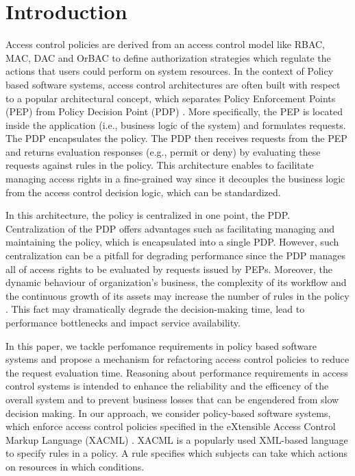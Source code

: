 
\section{Introduction} \label{sec:introduction}

Access control policies are derived from an access control model like RBAC, MAC, DAC and OrBAC \cite{dac,mac,rbac,orbac} to define authorization strategies which regulate the
 actions 
that users could perform on system resources. In the context of Policy based software systems, access control architectures are often built with respect to a popular 
architectural 
concept, which separates Policy Enforcement Points (PEP) from Policy Decision Point (PDP) \cite{separation}. More specifically, the PEP is located inside 
the application (i.e., business logic of the system) and formulates requests.
The PDP encapsulates the policy. The PDP then receives requests from the PEP and returns evaluation responses (e.g., permit or deny) by evaluating these requests 
against rules in the policy. This architecture enables to facilitate managing access rights in a fine-grained way since it 
decouples the business logic from the access control decision logic, which can be standardized. 

In this architecture, the policy is centralized in one point, the PDP. Centralization of the PDP offers advantages such as facilitating managing and maintaining the policy, 
which is encapsulated into a single PDP. However, such centralization can be a pitfall for degrading performance since the PDP manages all of access rights to be evaluated by 
requests issued by PEPs. Moreover, the dynamic behaviour of organization's business, the complexity of its workflow and the continuous growth of its assets may increase the 
number of rules in the policy \cite{policymanagement}. This fact may dramatically degrade the decision-making time, lead to performance bottlenecks and impact service 
availability.

In this paper, we tackle perfomance requirements in policy based software systems and propose a mechanism for refactoring access control policies to reduce
the request evaluation time. Reasoning about performance requirements in access control systems is intended to enhance the reliability and the efficency of the overall system 
and to prevent business losses that can be engendered from slow decision making. In our approach, we consider policy-based software systems, which
enforce access control policies specified in the eXtensible Access Control Markup Language (XACML) \cite{sunxacml}. XACML is a popularly used XML-based language to specify rules 
in a policy. A rule specifies which subjects can take which actions on resources in which conditions.

